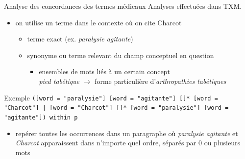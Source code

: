 \documentclass[xcolor={table,usenames,dvipsnames}]{beamer}
\let\olditem\item
\renewcommand{\item}{%
\olditem\vspace{0pt}}
\newcommand{\bolder}[1]{{\color{purple}\bfseries#1}}
\let\oldfootnotesize\footnotesize
\renewcommand*{\footnotesize}{\oldfootnotesize\scriptsize}
\begin{document}
\begin{frame}{Analyse des concordances des termes médicaux}
	Analyses effectuées dans \textsc{TXM}.
	\begin{itemize}
		\item on utilise un terme dans le contexte où on cite Charcot
		\begin{itemize}
			\item terme exact (ex. \textit{paralysie agitante})
			\item synonyme ou terme relevant du champ conceptuel en question
			\begin{itemize}
				\item ensembles de mots liés à un certain concept \citep{costachescu2024}\\
				\textit{pied tabétique} $\rightarrow$ forme particulière d'\textit{arthropathies tabétiques}
			\end{itemize}
		\end{itemize}
	\end{itemize}
	\begin{alertblock}{Exemple}
		\texttt{([word = "paralysie"] [word = "agitante"] []* [word = "Charcot"] | [word = "Charcot"] []* [word = "paralysie"] [word = "agitante"]) within p}
				\begin{itemize}
					\item repérer toutes les occurrences dans un paragraphe où \textit{paralysie agitante} et \textit{Charcot} apparaissent dans n'importe quel ordre, séparés par 0 ou plusieurs mots
		\end{itemize}
	\end{alertblock}
\end{frame}
%	
%	
\end{document}

